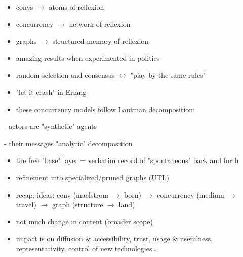 \documentclass[a4paper,10pt]{article}
\newcommand{\marked}[1]{\par\addvspace{2pt}{\bfseries #1}\par\nopagebreak}
\renewenvironment{leftbar}{%
  \def\FrameCommand{{\color{black!30}\vrule width 1.2pt}\hspace{6pt}}%
  \MakeFramed{\advance\hsize-\width \FrameRestore}}{\endMakeFramed}
\newenvironment{commentary}{\par\vspace{-2pt}\begin{leftbar}\color{black!80}}{\end{leftbar}}
\begin{document}
\begin{commentary}
\marked{Overview diagram}
\begin{itemize}
\item convs \ensuremath{\to} atoms of reflexion
\item concurrency \ensuremath{\to} network of reflexion
\item graphs \ensuremath{\to} structured memory of reflexion
\end{itemize}
\marked{\textcolor{conversationrose}{Conversation}}
\begin{itemize}
\item amazing results when experimented in politics
\end{itemize}\vspace{2pt}
\begin{itemize}
\item random selection and consensus \ensuremath{\leftrightarrow} "play by the same rules"
\item "let it crash" in Erlang
\end{itemize}
\marked{\textcolor{messageindigo}{Together}}
\begin{itemize}
\item these concurrency models follow Lautman decomposition:
\end{itemize}
- actors are "synthetic" agents\par
- their messages "analytic" decomposition\par
\marked{\textcolor{graphblue}{Graph}}
\begin{itemize}
\item the free "base" layer = verbatim record of "spontaneous" back and forth
\item refinement into specialized/pruned graphs (UTL)
\end{itemize}\vspace{2pt}
\begin{itemize}
\item recap, ideas: conv (maelstrom \ensuremath{\to} born) \ensuremath{\to} concurrency (medium \ensuremath{\to} travel) \ensuremath{\to} graph (structure \ensuremath{\to} land)
\end{itemize}
\marked{\textcolor{independencecopper}{Independently}}
\begin{itemize}
\item not much change in content (broader scope)
\item impact is on diffusion \& accessibility, trust, usage \& usefulness, representativity, control of new technologies…
\end{itemize}
\end{commentary}
\end{document}
